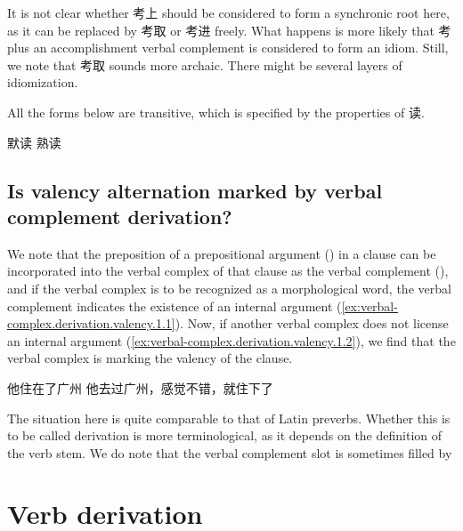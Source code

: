 \documentclass[UTF8, a4paper, oneside, scheme=plain, 12pt]{ctexrep}
\begin{document}
It is not clear whether 考上 should be considered to form a synchronic root here,
as it can be replaced by 考取 or 考进 freely.
What happens is more likely that 考 plus an accomplishment verbal complement is considered to form an idiom.
Still, we note that 考取 sounds more archaic.
There might be several layers of idiomization.

All the forms below are transitive,
which is specified by the properties of 读.

\begin{exe}
    \ex 默读 熟读
\end{exe}

\subsection{Is valency alternation marked by verbal complement derivation?}\label{sec:verbal-complex.derivation.valency}

We note that the preposition of a prepositional argument  
() in a clause
can be incorporated into the verbal complex of that clause
as the verbal complement (),
and if the verbal complex is to be recognized as a morphological word,
the verbal complement indicates the existence of an internal argument
(\ref{ex:verbal-complex.derivation.valency.1.1}).
Now, if another verbal complex does not license an internal argument 
(\ref{ex:verbal-complex.derivation.valency.1.2}),
we find that the verbal complex is marking the valency of the clause.

\begin{exe}
    \ex\label{ex:verbal-complex.derivation.valency.1} \begin{xlist}
        \ex\label{ex:verbal-complex.derivation.valency.1.1} 他住在了广州
        \ex\label{ex:verbal-complex.derivation.valency.1.2} 他去过广州，感觉不错，就住下了
    \end{xlist}
\end{exe}

The situation here is quite comparable to that of Latin preverbs.
Whether this is to be called derivation is more terminological,
as it depends on the definition of the verb stem.
We do note that the verbal complement slot is sometimes filled by 


\section{Verb derivation}
\end{document}
